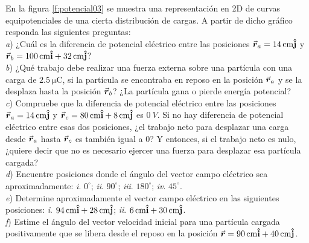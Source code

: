 %
\begin{Exercise}\label{p:potencial03}
  En la figura \ref{f:potencial03} se muestra una representación en 2D de curvas equipotenciales de una cierta distribución de cargas. A partir de dicho gráfico responda las siguientes preguntas:\\
  \textit{a}) ¿Cuál es la diferencia de potencial eléctrico entre las posiciones $\va*{r}_a = \SI{14}{cm}\vu{j}$ y $\va*{r}_b = \SI{100}{cm}\vu{i} + \SI{32}{cm}\vu{j}$?\\
  \textit{b}) ¿Qué trabajo debe realizar una fuerza externa sobre una partícula con una carga de $\SI{2.5}{\micro\coulomb}$, si la partícula se encontraba en reposo en la posición $\va*{r}_a$ y se la desplaza hasta la posición $\va*{r}_b$? ¿La partícula gana o pierde energía potencial?\\
  \textit{c}) Compruebe que la diferencia de potencial eléctrico entre las posiciones $\va*{r}_a = \SI{14}{cm}\vu{j}$ y $\va*{r}_c = \SI{80}{cm}\vu{i} + \SI{8}{cm}\vu{j}$ es $\SI{0}{V}$. Si no hay diferencia de potencial eléctrico entre esas dos posiciones, ¿el trabajo neto para desplazar una carga desde $\va*{r}_a$ hasta $\va*{r}_c$ es también igual a $0$? Y entonces, si el trabajo neto es nulo, ¿quiere decir que no es necesario ejercer una fuerza para desplazar esa partícula cargada?\\
  \textit{d}) Encuentre posiciones donde el ángulo del vector campo eléctrico sea aproximadamente: \textit{i}. $0^\circ$; \textit{ii}. $90^\circ$; \textit{iii}. $180^\circ$; \textit{iv}. $45^\circ$.\\
  \textit{e}) Determine aproximadamente el vector campo eléctrico en las siguientes posiciones: \textit{i}. $\SI{94}{cm}\vu{i} + \SI{28}{cm}\vu{j}$; \textit{ii}. $\SI{6}{cm}\vu{i} + \SI{30}{cm}\vu{j}$.\\
  \textit{f}) Estime el ángulo del vector velocidad inicial para una partícula cargada positivamente que se libera desde el reposo en la posición $\va*{r} = \SI{90}{cm}\vu{i} + \SI{40}{cm}\vu{j}\,.$
\end{Exercise}
